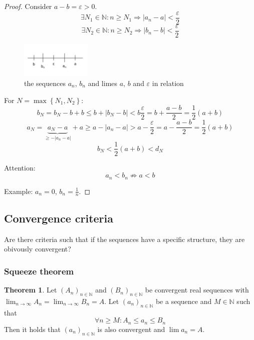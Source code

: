 \documentclass[a4paper,landscape,twocolumn]{article}
\theoremstyle{definition}
\newtheorem{theorem}{Theorem}
\newcommand\set[1]{\left\{#1\right\}}
\newcommand\abs[1]{\left|#1\right|}
\newcommand\seq[1]{{\left(#1\right)}_{n \in \mathbb N}}
\begin{document}
\begin{proof}
  Consider $a - b = \varepsilon > 0$.
  \[ \exists N_1 \in \mathbb N: n \geq N_1 \Rightarrow \abs{a_n - a} < \frac{\varepsilon}{2} \]
  \[ \exists N_2 \in \mathbb N: n \geq N_2 \Rightarrow \abs{b_n - b} < \frac{\varepsilon}{2} \]

  \begin{figure}[!h]
    \begin{center}
      \includegraphics[width=0.3\textwidth]{img/limes.pdf}
      \caption{the sequences $a_n$, $b_n$ and limes $a$, $b$ and $\varepsilon$ in relation}
    \end{center}
  \end{figure}

  For $N = \max\set{N_1, N_2}$:
  \[
      b_N
      = b_N - b + b \leq b + \abs{b_N - b} < b \frac{\varepsilon}{2}
      = b + \frac{a - b}{2}
      = \frac12 (a + b)
  \] \[
      a_N
      = \underbrace{a_N - a}_{\geq -\abs{a_n - a}} + a \geq a - \abs{a_n - a} > a - \frac{\varepsilon}{2}
      = a - \frac{a - b}{2}
      = \frac12 (a + b)
  \] \[
      b_N < \frac12 (a + b) < d_N
  \]

  Attention:
  \[ a_n < b_n \not\Rightarrow a < b \]

  Example: $a_n = 0$, $b_n = \frac1n$.
\end{proof}

\subsection{Convergence criteria}
%
Are there criteria such that if the sequences have a specific structure,
they are obivously convergent?

\subsubsection{Squeeze theorem}
\begin{theorem}
  Let $\seq{A_n}$ and $\seq{B_n}$ be convergent real sequences with $\lim_{n \to \infty} A_n = \lim_{n \to \infty} B_n = A$.
  Let $\seq{a_n}$ be a sequence and $M \in \mathbb N$ such that
  \[ \forall n \geq M: A_n \leq a_n \leq B_n \]
  Then it holds that $\seq{a_n}$ is also convergent and $\lim{a_n} = A$.
\end{theorem}
\end{document}
